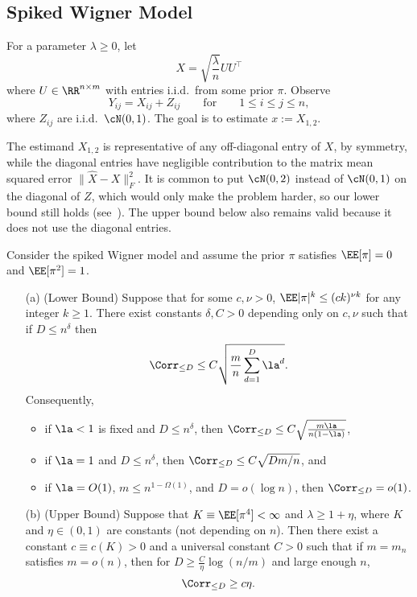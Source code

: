 \documentclass[11pt]{article}
\begin{document}
\subsection{Spiked Wigner Model}

\begin{definition}
For a parameter $\lambda \ge 0$, let
\[ X = \sqrt{\frac{\lambda}{n}} UU^\top \]
where $U \in \RR^{n \times m}$ with entries i.i.d.\ from some prior $\pi$. Observe
\[ Y_{ij} = X_{ij} + Z_{ij} \qquad \text{for} \qquad 1 \le i \le j \le n, \]
where $Z_{ij}$ are i.i.d.\ $\cN(0,1)$. The goal is to estimate $x := X_{1,2}$.
\end{definition}

\noindent The estimand $X_{1,2}$ is representative of any off-diagonal entry of $X$, by symmetry, while the diagonal entries have negligible contribution to the matrix mean squared error $\|\hat{X} - X\|_F^2$. It is common to put $\cN(0,2)$ instead of $\cN(0,1)$ on the diagonal of $Z$, which would only make the problem harder, so our lower bound still holds (see~\cite[Claim~A.2]{SW-estimation}). The upper bound below also remains valid because it does not use the diagonal entries.

\begin{theorem}\label{thm:main-wigner}
Consider the spiked Wigner model and assume the prior $\pi$ satisfies $\EE[\pi] = 0$ and $\EE[\pi^2] = 1$.
\begin{enumerate}
\item[(a)] (Lower Bound) Suppose that for some $c,\nu>0$, $\EE |\pi|^k\leq (ck)^{\nu k}$ for any integer $k\geq 1$. There exist constants $\delta,C>0$ depending only on $c, \nu$ such that if $D \le n^\delta$ then
\[ \Corr_{\le D} \le C \sqrt{\frac{m}{n}\sum_{d=1}^{D}\la^d}.
\]
Consequently,
\begin{itemize}
\item if $\la<1$ is fixed and $D\leq n^{\delta}$, then $\Corr_{\le D}\leq C\sqrt{\frac{m\la}{n(1-\la)}}$,
\item if $\la=1$ and $D \le n^\delta$, then $\Corr_{\leq D} \leq C\sqrt{Dm/n}$, and
\item if $\la=O(1)$, $m \le n^{1-\Omega(1)}$, and $D = o(\log n)$, then $\Corr_{\leq D}=o(1)$.
\end{itemize}

\item[(b)] (Upper Bound) Suppose that $K\equiv \EE[\pi^4]<\infty$ and $\lambda \ge 1+\eta$, where $K$ and $\eta \in (0,1)$ are constants (not depending on $n$). Then there exist a constant $c \equiv c(K) > 0$ and a universal constant $C > 0$ such that if $m=m_n$ satisfies $m = o(n)$, then for $D\geq \frac{C}{\eta}\log (n/m)$ and large enough $n$,
\[ \Corr_{\le D} \ge c\eta. \]
\end{enumerate}
\end{theorem}
\end{document}
